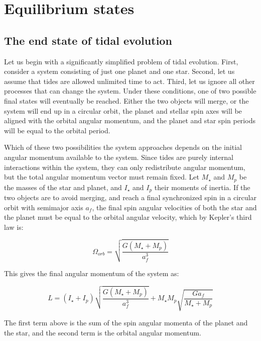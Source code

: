 \section{Equilibrium states}
%
\label{sec:equilibrium}

\subsection{The end state of tidal evolution}

Let us begin with a significantly simplified problem of tidal evolution. First,
consider a system consisting of just one planet and one star. Second, let us
assume that tides are allowed unlimited time to act. Third, let us ignore all
other processes that can change the system. Under these conditions, one of two
possible final states will eventually be reached. Either the two objects will
merge, or the system will end up in a circular orbit, the planet and stellar
spin axes will be aligned with the orbital angular momentum, and the planet and
star spin periods will be equal to the orbital period.

Which of these two possibilities the system approaches depends on the initial
angular momentum available to the system. Since tides are purely internal
interactions within the system, they can only redistribute angular momentum, but
the total angular momentum vector must remain fixed. Let $M_\star$ and $M_p$ be
the masses of the star and planet, and $I_\star$ and $I_p$ their moments of
inertia.  If the two objects are to avoid merging, and reach a final
synchronized spin in a circular orbit with semimajor axis $a_f$, the final spin
angular velocities of both the star and the planet must be equal to the orbital
angular velocity, which by Kepler's third law is:

\begin{equation}
%
    \Omega_{orb} = \sqrt{\frac{G (M_\star + M_p)}{a_f^3}}
%
\end{equation}

This gives the final angular momentum of the system as:

\begin{equation}
%
    L
%
    =
%
    \left(I_\star + I_p\right) \sqrt{\frac{G (M_\star + M_p)}{a_f^3}}
%
    +
%
    M_\star M_p \sqrt{\frac{G a_f}{M_\star + M_p}}
%
    \label{eq:equilibrium_angmom}
%
\end{equation}

The first term above is the sum of the spin angular momenta of the planet and
the star, and the second term is the orbital angular momentum.

